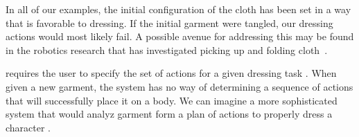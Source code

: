 In all of our examples, the initial configuration of the cloth has been
set in a way that is favorable to dressing.  If the initial garment were
tangled, our dressing actions would most likely fail.  A possible avenue
for addressing this may be found in the robotics research that has
investigated picking up and folding cloth~\cite{Cusumano:2011:BCD}.

  requires the user to specify
the set of actions for a given dressing task . When given a new garment,
the system has no way of determining a sequence of actions that will
successfully place it on a body.  We can imagine a more sophisticated
system that would analyz   garment\new{,} form a plan of
actions to properly dress a character .  

